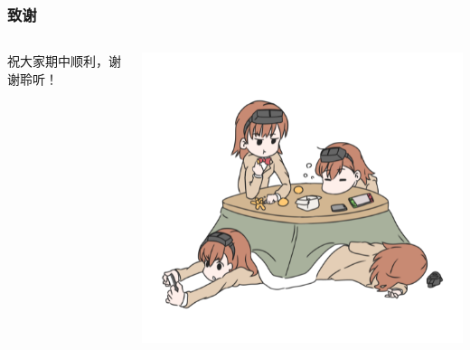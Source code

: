 \documentclass[12pt,AutoFakeBold,aspectratio=169,mathserif]{beamer}
\begin{document}
    \begin{frame}
        \frametitle{致谢}
        \begin{columns}
            \begin{column}{.5\linewidth}
                祝大家期中顺利，谢谢聆听！
            \end{column}
            \begin{column}{.5\linewidth}
                \includegraphics[width=.4\paperwidth]{figures/misaka558.png}
            \end{column}
        \end{columns}
    \end{frame}
    
\end{document}

